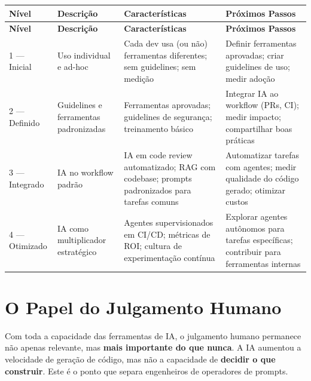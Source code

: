 \begin{longtable}{>{\raggedright\arraybackslash}p{2cm}
                  >{\raggedright\arraybackslash}p{3cm}
                  >{\raggedright\arraybackslash}p{3.5cm}
                  >{\raggedright\arraybackslash}p{4cm}}
\toprule
\textbf{Nível} & \textbf{Descrição} & \textbf{Características} &
\textbf{Próximos Passos} \\
\midrule
\endfirsthead
\toprule
\textbf{Nível} & \textbf{Descrição} & \textbf{Características} &
\textbf{Próximos Passos} \\
\midrule
\endhead
\bottomrule
\endfoot

1 --- Inicial &
Uso individual e ad-hoc &
Cada dev usa (ou não) ferramentas diferentes; sem guidelines; sem medição &
Definir ferramentas aprovadas; criar guidelines de uso; medir adoção \\
\midrule

2 --- Definido &
Guidelines e ferramentas padronizadas &
Ferramentas aprovadas; guidelines de segurança; treinamento básico &
Integrar IA ao workflow (PRs, CI); medir impacto; compartilhar boas práticas \\
\midrule

3 --- Integrado &
IA no workflow padrão &
IA em code review automatizado; RAG com codebase; prompts padronizados para tarefas comuns &
Automatizar tarefas com agentes; medir qualidade do código gerado; otimizar custos \\
\midrule

4 --- Otimizado &
IA como multiplicador estratégico &
Agentes supervisionados em CI/CD; métricas de ROI; cultura de experimentação contínua &
Explorar agentes autônomos para tarefas específicas; contribuir para ferramentas internas \\

\end{longtable}

\section{O Papel do Julgamento Humano}

Com toda a capacidade das ferramentas de IA, o julgamento humano permanece
não apenas relevante, mas \textbf{mais importante do que nunca}. A IA
aumentou a velocidade de geração de código, mas não a capacidade de
\textbf{decidir o que construir}. Este é o ponto que separa engenheiros
de operadores de prompts.

